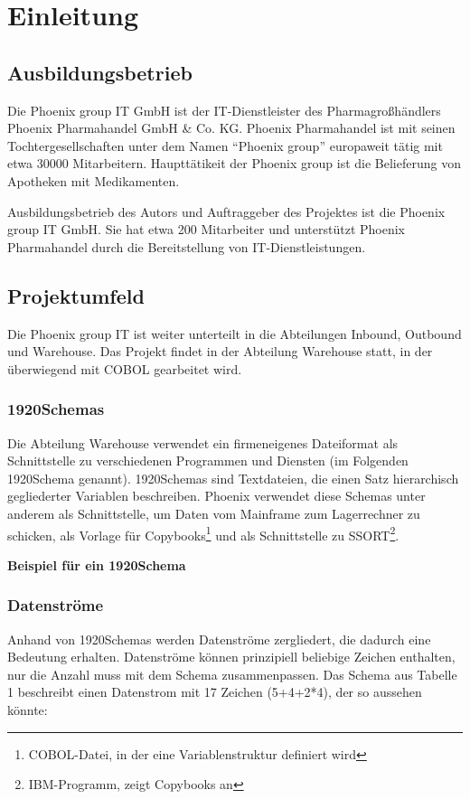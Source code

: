 \section{Einleitung}
\label{sec:Einleitung}
\subsection{Ausbildungsbetrieb}
\label{sec:Ausbildungsbetrieb}
Die Phoenix group IT GmbH ist der IT-Dienstleister des Pharmagroßhändlers Phoenix Pharmahandel GmbH \& Co. KG. Phoenix Pharmahandel ist mit seinen Tochtergesellschaften unter dem Namen ``Phoenix group'' europaweit tätig mit etwa 30000 Mitarbeitern. Haupttätikeit der Phoenix group ist die Belieferung von Apotheken mit Medikamenten.

Ausbildungsbetrieb des Autors und Auftraggeber des Projektes ist die Phoenix group IT GmbH. Sie hat etwa 200 Mitarbeiter und unterstützt Phoenix Pharmahandel durch die Bereitstellung von IT-Dienstleistungen.

\subsection{Projektumfeld} 
\label{sec:Projektumfeld}
Die Phoenix group IT ist weiter unterteilt in die Abteilungen Inbound, Outbound und Warehouse. Das Projekt findet in der Abteilung Warehouse statt, in der überwiegend mit COBOL gearbeitet wird.
\subsubsection{1920Schemas}
Die Abteilung Warehouse verwendet ein firmeneigenes Dateiformat als Schnittstelle zu verschiedenen Programmen und Diensten (im Folgenden 1920Schema genannt).
1920Schemas sind Textdateien, die einen Satz hierarchisch gegliederter Variablen beschreiben. Phoenix verwendet diese Schemas unter anderem als Schnittstelle, um Daten vom Mainframe zum Lagerrechner zu schicken, als Vorlage für Copybooks\footnote{COBOL-Datei, in der eine Variablenstruktur definiert wird} und als Schnittstelle zu SSORT\footnote{IBM-Programm, zeigt Copybooks an}.

\textbf{Beispiel für ein 1920Schema}

\subsubsection{Datenströme}
Anhand von 1920Schemas werden Datenströme zergliedert, die dadurch eine Bedeutung erhalten. Datenströme können prinzipiell beliebige Zeichen enthalten, nur die Anzahl muss mit dem Schema zusammenpassen. Das Schema aus Tabelle 1 beschreibt einen Datenstrom mit 17 Zeichen (5+4+2*4), der so aussehen könnte:


